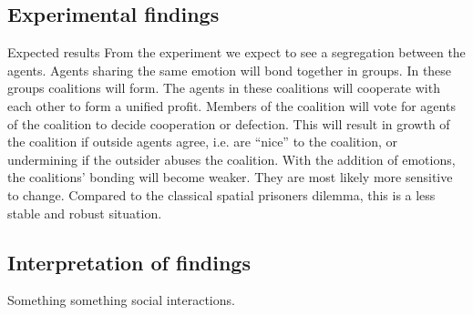 \subsection*{Experimental findings}
Expected results
From the experiment we expect to see a segregation between the agents. Agents sharing the same emotion will bond together in groups. In these groups coalitions will form. The agents in these coalitions will cooperate with each other to form a unified profit. Members of the coalition will vote for agents of the coalition to decide cooperation or defection. This will result in growth of the coalition if outside agents agree, i.e. are ``nice'' to the coalition, or undermining if the outsider abuses the coalition. With the addition of emotions, the coalitions' bonding will become weaker. They are most likely more sensitive to change. Compared to the classical spatial prisoners dilemma, this is a less stable and robust situation.

\subsection*{Interpretation of findings}
Something something social interactions.